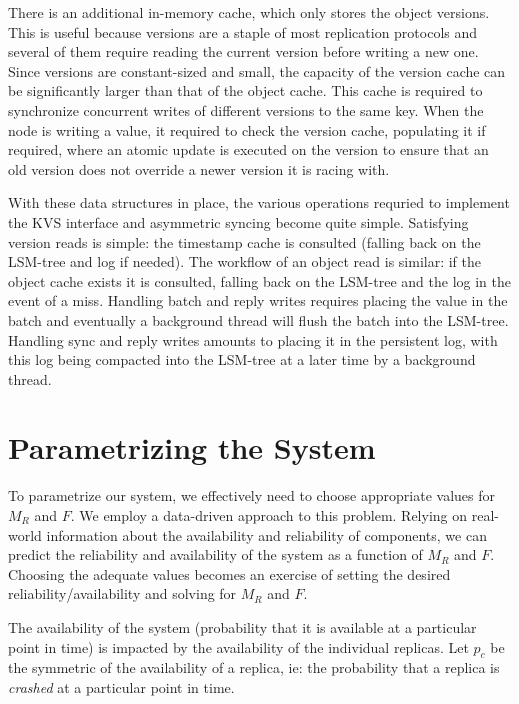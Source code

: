 There is an additional in-memory cache, which only stores the
object versions. This is useful because versions are a staple of
most replication protocols and several of them require reading
the current version before writing a new one. Since versions are
constant-sized and small, the capacity of the version cache can
be significantly larger than that of the object cache. This cache
is required to synchronize concurrent writes of different
versions to the same key. When the node is writing a value, it required to
check the version cache, populating it if required, where an
atomic update is executed on the version to ensure that an old
version does not override a newer version it is racing with.

With these data structures in place, the various operations
requried to implement the \ac{KVS} interface and asymmetric
syncing become quite simple. Satisfying version reads is simple:
the timestamp cache is consulted (falling back on the
\ac{LSM-tree} and log if needed). The workflow of an object read
is similar: if the object cache exists it is consulted, falling
back on the \ac{LSM-tree} and the log in the event of a miss.
Handling batch and reply writes requires placing the value
in the batch and eventually a background thread will flush the
batch into the \ac{LSM-tree}. Handling sync and reply writes
amounts to placing it in the persistent log, with this log being
compacted into the \ac{LSM-tree} at a later time by a background
thread.


\section{Parametrizing the System}\label{sec:r2s2parametrization}

To parametrize our system, we effectively need to choose
appropriate values for $M_R$ and $F$. We employ a data-driven
approach to this problem. Relying on real-world information about
the availability and reliability of components, we can predict
the reliability and availability of the system as a function of
$M_R$ and $F$. Choosing the adequate values becomes an exercise of
setting the desired reliability/availability and solving for $M_R$
and $F$.

The availability of the system (probability that it is available
at a particular point in time) is impacted by the availability of
the individual replicas. Let $p_c$ be the symmetric of the
availability of a replica, ie: the probability that a replica is
\emph{crashed} at a particular point in time.

